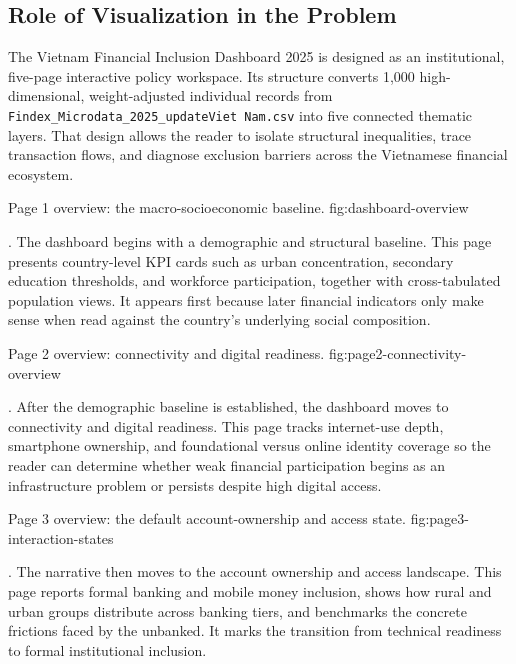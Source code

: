 \documentclass[../main.tex]{subfiles}
\begin{document}
\subsection{Role of Visualization in the Problem}

The Vietnam Financial Inclusion Dashboard 2025 is designed as an institutional,
five-page interactive policy workspace. Its structure converts 1,000
high-dimensional, weight-adjusted individual records from
\texttt{Findex\_Microdata\_2025\_updateViet Nam.csv} into five connected
thematic layers. That design allows the reader to isolate structural
inequalities, trace transaction flows, and diagnose exclusion barriers across
the Vietnamese financial ecosystem.

{Page 1 overview: the macro-socioeconomic baseline.}
{fig:dashboard-overview}

. The
dashboard begins with a demographic and structural baseline. This page presents
country-level KPI cards such as urban concentration, secondary education
thresholds, and workforce participation, together with cross-tabulated
population views. It appears first because later financial indicators only make
sense when read against the country's underlying social composition.

{Page 2 overview: connectivity and digital readiness.}
{fig:page2-connectivity-overview}

. After
the demographic baseline is established, the dashboard moves to connectivity
and digital readiness. This page tracks internet-use depth, smartphone
ownership, and foundational versus online identity coverage so the reader can
determine whether weak financial participation begins as an infrastructure
problem or persists despite high digital access.

{Page 3 overview: the default account-ownership and access state.}
{fig:page3-interaction-states}

. The
narrative then moves to the account ownership and access landscape. This page
reports formal banking and mobile money inclusion, shows how rural and urban
groups distribute across banking tiers, and benchmarks the concrete frictions
faced by the unbanked. It marks the transition from technical readiness to
formal institutional inclusion.
\end{document}

